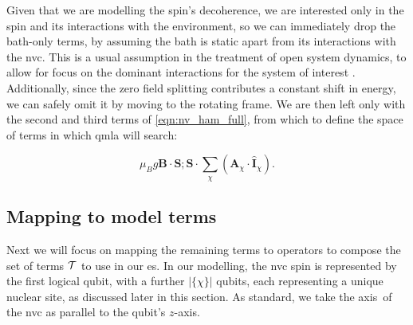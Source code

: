 
Given that we are modelling the spin's decoherence, 
    we are interested only in the spin and its interactions with the environment, 
    so we can immediately drop the bath-only terms, 
    by assuming the bath is static apart from its interactions with the \gls{nvc}. 
This is a usual assumption in the treatment of open system dynamics, 
    to allow for focus on the dominant interactions for the system of interest \cite{breuer2002theory}. 
Additionally, since the zero field splitting contributes a constant shift in energy, 
    we can safely omit it by moving to the rotating frame. 
We are then left only with the second and third terms of \cref{eqn:nv_ham_full}, 
    from which to define the space of terms in which \gls{qmla} will search:

\begin{subequations}
    \begin{equation}
        \label{eqn:nv_spin_terms}
        \mu_B g \mathbf{B} \cdot \mathbf{S};
    \end{equation}
    \begin{equation}
        \label{eqn:nv_hyperfine_terms}
        \mathbf{S} \cdot \sum_{\chi} \left( \mathbf{A}_{\chi} \cdot \mathbf{\hat{I}}_{\chi} \right).
    \end{equation}
\end{subequations}

\subsection{Mapping to model terms}
Next we will focus on mapping the remaining terms to operators to compose the set of terms 
    $\mathcal{T}$ to use in our \gls{es}. 
In our modelling, the \gls{nvc} spin is represented by the first logical qubit, 
    with a further $|\{\chi\}|$ qubits, each representing a unique nuclear site, 
    as discussed later in this section. 
As standard, we take the axis\footnotemark \ of the \gls{nvc} as parallel to the qubit's $z$-axis. 

\par 

